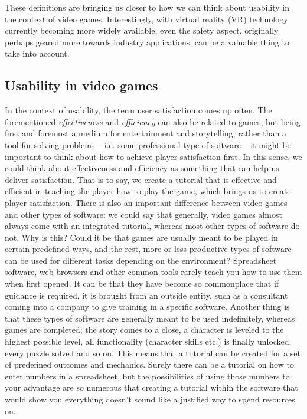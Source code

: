 These definitions are bringing us closer to how we can think about usability in the context of video games. Interestingly, with virtual reality (VR) technology currently becoming more widely available, even the safety aspect, originally perhaps geared more towards industry applications, can be a valuable thing to take into account.

\subsection{Usability in video games}

In the context of usability, the term user satisfaction comes up often. The forementioned \textit{effectiveness} and \textit{efficiency} can also be related to games, but being first and foremost a medium for entertainment and storytelling, rather than a tool for solving problems -- i.e. some professional type of software -- it might be important to think about how to achieve player satisfaction first. In this sense, we could think about effectiveness and efficiency as something that can help us deliver satisfaction. That is to say, we create a tutorial that is effective and efficient in teaching the player how to play the game, which brings us to create player satisfaction. There is also an important difference between video games and other types of software: we could say that generally, video games almost always come with an integrated tutorial, whereas most other types of software do not. Why is this? Could it be that games are usually meant to be played in certain predefined ways, and the rest, more or less productive types of software can be used for different tasks depending on the environment? Spreadsheet software, web browsers and other common tools rarely teach you how to use them when first opened. It can be that they have become so commonplace that if guidance is required, it is brought from an outside entity, such as a consultant coming into a company to give training in a specific software. Another thing is that these types of software are generally meant to be used indefinitely, whereas games are completed; the story comes to a close, a character is leveled to the highest possible level, all functionality (character skills etc.) is finally unlocked, every puzzle solved and so on. This means that a tutorial can be created for a set of predefined outcomes and mechanics. Surely there can be a tutorial on how to enter numbers in a spreadsheet, but the possibilities of using those numbers to your advantage are so numerous that creating a tutorial within the software that would show you everything doesn't sound like a justified way to spend resources on.


